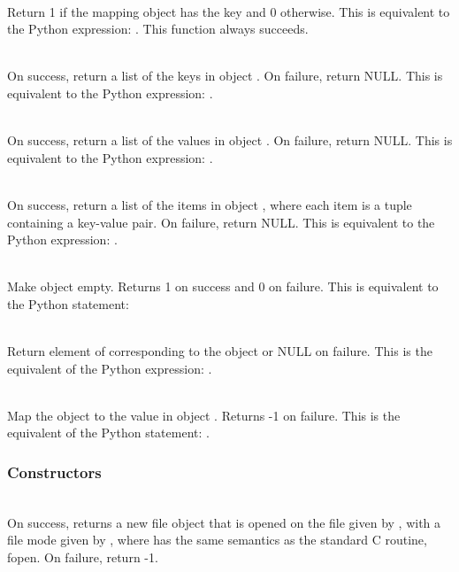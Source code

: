     \\
	 Return 1 if the mapping object has the key 
	 and 0 otherwise.  This is equivalent to the Python expression:
	 . 
	 This function always succeeds.


     \\
         On success, return a list of the keys in object .  On
	 failure, return NULL. This is equivalent to the Python
	 expression: .


     \\
         On success, return a list of the values in object .  On
	 failure, return NULL. This is equivalent to the Python
	 expression: .


     \\
         On success, return a list of the items in object , where
	 each item is a tuple containing a key-value pair.  On
	 failure, return NULL. This is equivalent to the Python
	 expression: .

     \\
         Make object  empty.  Returns 1 on success and 0 on failure.
	 This is equivalent to the Python statement:


     \\
	 Return element of  corresponding to the object  or NULL
	 on failure. This is the equivalent of the Python expression:
	 .

     \\
         Map the object  to the value  in object .  Returns 
         -1 on failure.  This is the equivalent of the Python
         statement: .


\subsubsection{Constructors}

     \\
	 On success, returns a new file object that is opened on the
	 file given by , with a file mode given by ,
	 where  has the same semantics as the standard C routine,
	 fopen.  On failure, return -1.
     
